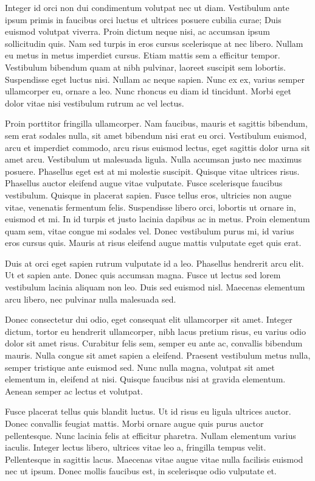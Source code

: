 \documentclass{article}
\begin{document}
Integer id orci non dui condimentum volutpat nec ut diam. Vestibulum ante ipsum primis in faucibus orci luctus et ultrices posuere cubilia curae; Duis euismod volutpat viverra. Proin dictum neque nisi, ac accumsan ipsum sollicitudin quis. Nam sed turpis in eros cursus scelerisque at nec libero. Nullam eu metus in metus imperdiet cursus. Etiam mattis sem a efficitur tempor. Vestibulum bibendum quam at nibh pulvinar, laoreet suscipit sem lobortis. Suspendisse eget luctus nisi. Nullam ac neque sapien. Nunc ex ex, varius semper ullamcorper eu, ornare a leo. Nunc rhoncus eu diam id tincidunt. Morbi eget dolor vitae nisi vestibulum rutrum ac vel lectus.

Proin porttitor fringilla ullamcorper. Nam faucibus, mauris et sagittis bibendum, sem erat sodales nulla, sit amet bibendum nisi erat eu orci. Vestibulum euismod, arcu et imperdiet commodo, arcu risus euismod lectus, eget sagittis dolor urna sit amet arcu. Vestibulum ut malesuada ligula. Nulla accumsan justo nec maximus posuere. Phasellus eget est at mi molestie suscipit. Quisque vitae ultrices risus. Phasellus auctor eleifend augue vitae vulputate. Fusce scelerisque faucibus vestibulum. Quisque in placerat sapien. Fusce tellus eros, ultricies non augue vitae, venenatis fermentum felis. Suspendisse libero orci, lobortis ut ornare in, euismod et mi. In id turpis et justo lacinia dapibus ac in metus. Proin elementum quam sem, vitae congue mi sodales vel. Donec vestibulum purus mi, id varius eros cursus quis. Mauris at risus eleifend augue mattis vulputate eget quis erat.

Duis at orci eget sapien rutrum vulputate id a leo. Phasellus hendrerit arcu elit. Ut et sapien ante. Donec quis accumsan magna. Fusce ut lectus sed lorem vestibulum lacinia aliquam non leo. Duis sed euismod nisl. Maecenas elementum arcu libero, nec pulvinar nulla malesuada sed.

Donec consectetur dui odio, eget consequat elit ullamcorper sit amet. Integer dictum, tortor eu hendrerit ullamcorper, nibh lacus pretium risus, eu varius odio dolor sit amet risus. Curabitur felis sem, semper eu ante ac, convallis bibendum mauris. Nulla congue sit amet sapien a eleifend. Praesent vestibulum metus nulla, semper tristique ante euismod sed. Nunc nulla magna, volutpat sit amet elementum in, eleifend at nisi. Quisque faucibus nisi at gravida elementum. Aenean semper ac lectus et volutpat.

Fusce placerat tellus quis blandit luctus. Ut id risus eu ligula ultrices auctor. Donec convallis feugiat mattis. Morbi ornare augue quis purus auctor pellentesque. Nunc lacinia felis at efficitur pharetra. Nullam elementum varius iaculis. Integer lectus libero, ultrices vitae leo a, fringilla tempus velit. Pellentesque in sagittis lacus. Maecenas vitae augue vitae nulla facilisis euismod nec ut ipsum. Donec mollis faucibus est, in scelerisque odio vulputate et.
\end{document}
